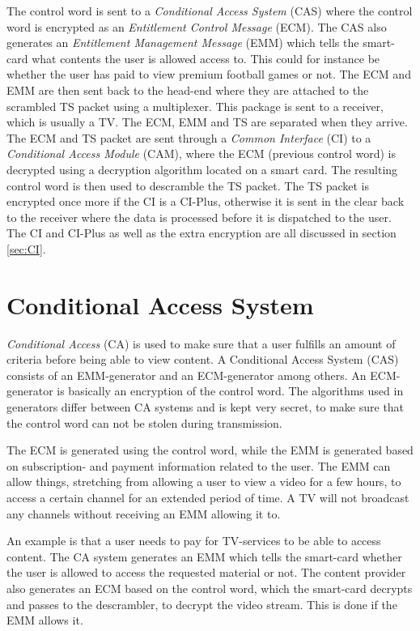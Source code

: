 The control word is sent to a \emph{Conditional Access System} (CAS) 
where the control word is encrypted as an 
\emph{Entitlement Control Message} (ECM). The CAS also generates an 
\emph{Entitlement Management Message} (EMM) which tells the smart-card 
what contents the user is allowed access to. This could for instance 
be whether the user has paid to view premium football games or not.
The ECM and EMM are then sent back to the head-end where they are 
attached to the scrambled TS packet using a multiplexer. 
This package is sent to a receiver, which is usually a TV. The ECM, 
EMM and TS are separated when they arrive. The ECM and TS packet are 
sent through a \emph{Common Interface} (CI) to a \emph{Conditional 
Access Module} (CAM), where the ECM (previous control word) is 
decrypted using a decryption algorithm located on a smart card. 
The resulting control word is then used to descramble the TS packet. 
The TS packet is encrypted once more if the CI is a CI-Plus, otherwise 
it is sent in the clear back to the receiver where the data is 
processed before it is dispatched to the user. The CI and CI-Plus as 
well as the extra encryption are all discussed in section \ref{sec:CI}.

\section{Conditional Access System} \label{sec:CAS}
\emph{Conditional Access} (CA) is used to make sure that a user 
fulfills an amount of criteria before being able to view content. A 
Conditional Access System (CAS) consists of an EMM-generator and an 
ECM-generator among others. An ECM-generator is basically an encryption 
of the control word. The algorithms used in generators differ between 
CA systems and is kept very secret, to make sure that the control word 
can not be stolen during transmission.

The ECM is generated using the control word, while the EMM is generated 
based on subscription- and payment information related to the user. The 
EMM can allow things, stretching from allowing a user to view a video 
for a few hours, to access a certain channel for an extended period of 
time. A TV will not broadcast any channels without receiving an EMM 
allowing it to.

An example is that a user needs to pay for TV-services to be able 
to access content. The CA system generates an EMM which tells 
the smart-card whether the user is allowed to access the requested 
material or not. The content provider also generates an ECM based on 
the control word, which the smart-card decrypts and passes to the 
descrambler, to decrypt the video stream. This is done if the EMM 
allows it.

